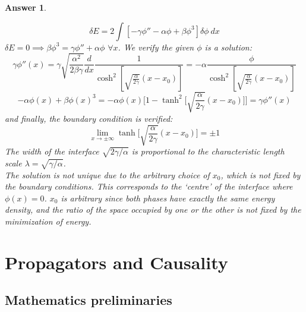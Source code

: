 \documentclass[a4paper]{article}
\newtheorem{ans}{Answer}[section]
\theoremstyle{new}
\begin{document}
\begin{ans}
\begin{enumerate}[label=(\alph*)]
$$\delta E=2\int[-\gamma\phi''-\alpha\phi+\beta\phi^3]\delta\phi~dx$$
$\delta E=0\implies\beta\phi^3=\gamma\phi''+\alpha\phi$ $\forall x$. We verify the given $\phi$ is a solution:
$$\gamma\phi''(x)=\gamma\sqrt{\frac{\alpha^2}{2\beta\gamma}}\frac{d}{dx}\frac{1}{\cosh^2[\sqrt{\frac{\alpha}{2\gamma}}(x-x_0)]}=-\alpha\frac{\phi}{\cosh^2[\sqrt{\frac{\alpha}{2\gamma}}(x-x_0)]}$$
$$-\alpha\phi(x)+\beta\phi(x)^3=-\alpha\phi(x)\bigg[1-\tanh^2\bigg[\sqrt{\frac{\alpha}{2\gamma}}(x-x_0)\bigg]\bigg]=\gamma\phi''(x)$$
and finally, the boundary condition is verified:
$$\lim_{x\rightarrow\pm\infty}\tanh\bigg[\sqrt{\frac{\alpha}{2\gamma}}(x-x_0)\bigg]=\pm1$$
The width of the interface $\sqrt{2\gamma/\alpha}$ is proportional to the characteristic length scale $\lambda=\sqrt{\gamma/\alpha}$.\\[5pt]
The solution is not unique due to the arbitrary choice of $x_0$, which is not fixed by the boundary conditions. This corresponds to the `centre' of the interface where $\phi(x)=0$. $x_0$ is arbitrary since both phases have exactly the same energy density, and the ratio of the space occupied by one or the other is not fixed by the minimization of energy.
\end{enumerate}
\end{ans}
\newpage
\section{Propagators and Causality}
\subsection{Mathematics preliminaries}
\end{document}

